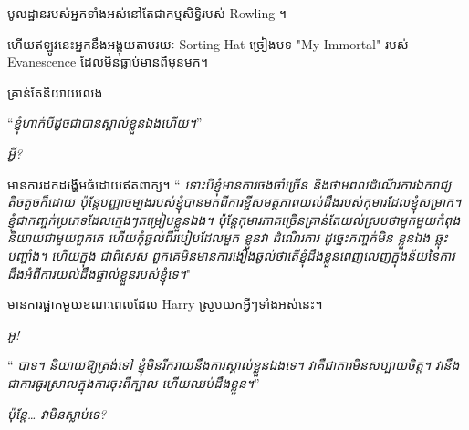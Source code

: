 
\begin{chapterOpeningAuthorNote}
មូលដ្ឋានរបស់អ្នកទាំងអស់នៅតែជាកម្មសិទ្ធិរបស់ Rowling ។

ហើយឥឡូវនេះអ្នកនឹងអង្គុយតាមរយៈ Sorting Hat ច្រៀងបទ "My Immortal" របស់ Evanescence ដែលមិនធ្លាប់មានពីមុនមក។

គ្រាន់តែនិយាយលេង
\end{chapterOpeningAuthorNote}


\hplettrineextrapara
“\emph{ខ្ញុំហាក់បីដូចជាបានស្គាល់ខ្លួនឯងហើយ។}”

\emph{អ្វី?}

មានការដកដង្ហើមធំដោយឥតពាក្យ។ “\emph{ ទោះបីខ្ញុំមានការចងចាំច្រើន និងថាមពលដំណើរការឯករាជ្យតិចតួចក៏ដោយ ប៉ុន្តែបញ្ញាចម្បងរបស់ខ្ញុំបានមកពីការខ្ចីសមត្ថភាពយល់ដឹងរបស់កុមារដែលខ្ញុំសម្រាក។ ខ្ញុំជាកញ្ចក់ប្រភេទដែលក្មេងៗតម្រៀប\emph{ខ្លួនឯង}។ ប៉ុន្តែកុមារភាគច្រើនគ្រាន់តែយល់ស្របថាមួកមួយកំពុងនិយាយជាមួយពួកគេ ហើយកុំឆ្ងល់ពីរបៀបដែលមួក \emph{ខ្លួនវា} ដំណើរការ ដូច្នេះកញ្ចក់មិន \emph{ខ្លួនឯង} ឆ្លុះបញ្ចាំង។ ហើយក្នុង \emph{ជាពិសេស} ពួកគេមិនមានការងឿងឆ្ងល់ថាតើខ្ញុំដឹងខ្លួនពេញលេញក្នុងន័យនៃការដឹងអំពីការយល់ដឹងផ្ទាល់ខ្លួនរបស់ខ្ញុំទេ។}"

មានការផ្អាកមួយខណៈពេលដែល Harry ស្រូបយកអ្វីៗទាំងអស់នេះ។

\emph{អូ!}

“\emph{ បាទ។ និយាយឱ្យត្រង់ទៅ ខ្ញុំមិនរីករាយនឹងការស្គាល់ខ្លួនឯងទេ។ វាគឺជាការមិនសប្បាយចិត្ត។ វា​នឹង​ជា​ការ​ធូរស្រាល​ក្នុង​ការ​ចុះ​ពី​ក្បាល ហើយ​ឈប់​ដឹង​ខ្លួន។}”

\emph{ប៉ុន្តែ… វាមិនស្លាប់ទេ?}

